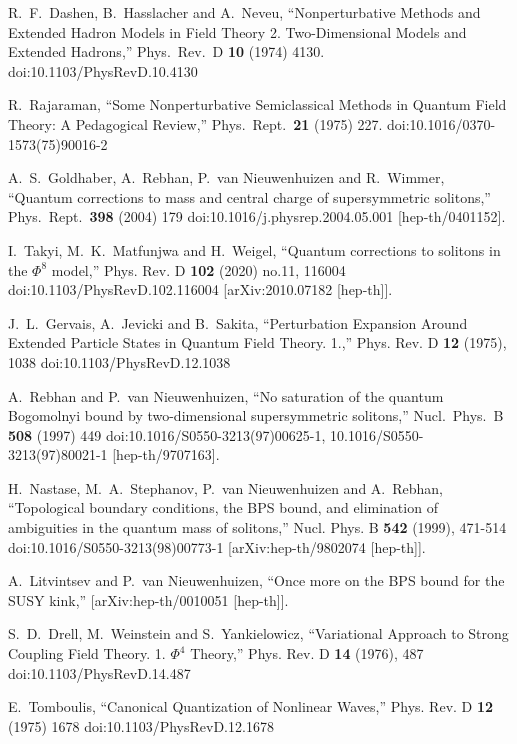 \def\letter{0}\def\pr{0}\documentclass[a4paper,12pt, epsfig]{article}
\renewcommand{\(}{\begin{equation}}
\renewcommand{\)}{end{equation} \vspace{-.05in}\linebreak}
\renewcommand{\=}{\hspace{-.03in}=\hspace{-.02in}}
\renewcommand{\(}{\begin{equation}}
\renewcommand{\)}{\end{equation}}
\renewcommand{\(}{\begin{equation}}
\renewcommand{\)}{\end{equation}}
\begin{document}
\begin{thebibliography}{99}

  R.~F.~Dashen, B.~Hasslacher and A.~Neveu,
  ``Nonperturbative Methods and Extended Hadron Models in Field Theory 2. Two-Dimensional Models and Extended Hadrons,''
  Phys.\ Rev.\ D {\bf 10} (1974) 4130.
 doi:10.1103/PhysRevD.10.4130

  R.~Rajaraman,
  ``Some Nonperturbative Semiclassical Methods in Quantum Field Theory: A Pedagogical Review,''
  Phys.\ Rept.\  {\bf 21} (1975) 227.
  doi:10.1016/0370-1573(75)90016-2

  A.~S.~Goldhaber, A.~Rebhan, P.~van Nieuwenhuizen and R.~Wimmer,
  ``Quantum corrections to mass and central charge of supersymmetric solitons,''
  Phys.\ Rept.\  {\bf 398} (2004) 179
  doi:10.1016/j.physrep.2004.05.001
  [hep-th/0401152].

I.~Takyi, M.~K.~Matfunjwa and H.~Weigel,
``Quantum corrections to solitons in the $\Phi^8$ model,''
Phys. Rev. D \textbf{102} (2020) no.11, 116004
doi:10.1103/PhysRevD.102.116004
[arXiv:2010.07182 [hep-th]].

J.~L.~Gervais, A.~Jevicki and B.~Sakita,
``Perturbation Expansion Around Extended Particle States in Quantum Field Theory. 1.,''
Phys. Rev. D \textbf{12} (1975), 1038
doi:10.1103/PhysRevD.12.1038

  A.~Rebhan and P.~van Nieuwenhuizen,
  ``No saturation of the quantum Bogomolnyi bound by two-dimensional supersymmetric solitons,''
  Nucl.\ Phys.\ B {\bf 508} (1997) 449
  doi:10.1016/S0550-3213(97)00625-1, 10.1016/S0550-3213(97)80021-1
 [hep-th/9707163].

H.~Nastase, M.~A.~Stephanov, P.~van Nieuwenhuizen and A.~Rebhan,
``Topological boundary conditions, the BPS bound, and elimination of ambiguities in the quantum mass of solitons,''
Nucl. Phys. B \textbf{542} (1999), 471-514
doi:10.1016/S0550-3213(98)00773-1
[arXiv:hep-th/9802074 [hep-th]].

A.~Litvintsev and P.~van Nieuwenhuizen,
``Once more on the BPS bound for the SUSY kink,''
[arXiv:hep-th/0010051 [hep-th]].

S.~D.~Drell, M.~Weinstein and S.~Yankielowicz,
``Variational Approach to Strong Coupling Field Theory. 1. $\Phi^4$ Theory,''
Phys. Rev. D \textbf{14} (1976), 487
doi:10.1103/PhysRevD.14.487

E.~Tomboulis, 
``{Canonical Quantization of Nonlinear Waves},''
Phys. Rev. D {\bf 12} (1975) 1678
doi:10.1103/PhysRevD.12.1678


\end{thebibliography}
\end{document}
